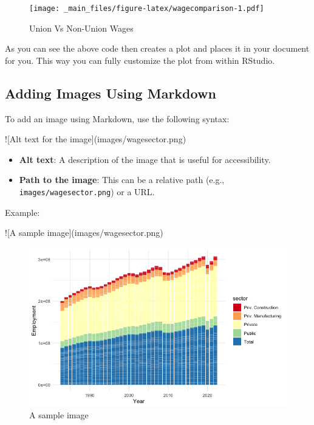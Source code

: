 \documentclass[
]{book}
\newenvironment{Shaded}{\begin{snugshade}}{\end{snugshade}}
\newcommand{\AlertTok}[1]{\textcolor[rgb]{0.94,0.16,0.16}{#1}}
\providecommand{\tightlist}{%
  \setlength{\itemsep}{0pt}\setlength{\parskip}{0pt}}
\theoremstyle{definition}
\theoremstyle{definition}
\theoremstyle{definition}
\theoremstyle{definition}
\theoremstyle{remark}
\begin{document}
\begin{figure}
\centering
\texttt{[image: \_main\_files/figure-latex/wagecomparison-1.pdf]}
\caption{\label{fig:wagecomparison}Union Vs Non-Union Wages}
\end{figure}

As you can see the above code then creates a plot and places it in your document for you. This way you can fully customize the plot from within RStudio.

\subsection{Adding Images Using Markdown}\label{adding-images-using-markdown}

To add an image using Markdown, use the following syntax:

\begin{Shaded}
\begin{Highlighting}[]
\AlertTok{![Alt text for the image](images/wagesector.png)}
\end{Highlighting}
\end{Shaded}

\begin{itemize}
\tightlist
\item
  \textbf{Alt text}: A description of the image that is useful for accessibility.
\item
  \textbf{Path to the image}: This can be a relative path (e.g., \texttt{images/wagesector.png}) or a URL.
\end{itemize}

Example:

\begin{Shaded}
\begin{Highlighting}[]
\AlertTok{![A sample image](images/wagesector.png)}
\end{Highlighting}
\end{Shaded}

\begin{figure}
\centering
\includegraphics{images/wagesector.png}
\caption{A sample image}
\end{figure}
\end{document}
